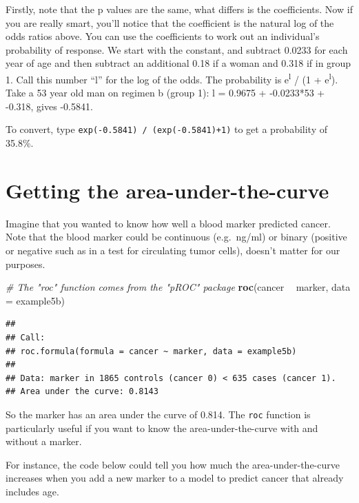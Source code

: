 \documentclass[]{book}
\newenvironment{Shaded}{\begin{snugshade}}{\end{snugshade}}
\newcommand{\CommentTok}[1]{\textcolor[rgb]{0.56,0.35,0.01}{\textit{#1}}}
\newcommand{\DataTypeTok}[1]{\textcolor[rgb]{0.13,0.29,0.53}{#1}}
\newcommand{\KeywordTok}[1]{\textcolor[rgb]{0.13,0.29,0.53}{\textbf{#1}}}
\newcommand{\NormalTok}[1]{#1}
\newcommand{\OperatorTok}[1]{\textcolor[rgb]{0.81,0.36,0.00}{\textbf{#1}}}
\newcommand{\StringTok}[1]{\textcolor[rgb]{0.31,0.60,0.02}{#1}}
\begin{document}
Firstly, note that the p values are the same, what differs is the
coefficients. Now if you are really smart, you'll notice that the
coefficient is the natural log of the odds ratios above. You can use the
coefficients to work out an individual's probability of response. We
start with the constant, and subtract 0.0233 for each year of age and
then subtract an additional 0.18 if a woman and 0.318 if in group 1.
Call this number ``l'' for the log of the odds. The probability is
e\textsuperscript{l} / (1 + e\textsuperscript{l}). Take a 53 year old
man on regimen b (group 1): l = 0.9675 + -0.0233*53 + -0.318, gives
-0.5841.

To convert, type \texttt{exp(-0.5841)\ /\ (exp(-0.5841)+1)} to get a
probability of 35.8\%.

\hypertarget{getting-the-area-under-the-curve}{%
\section{Getting the
area-under-the-curve}\label{getting-the-area-under-the-curve}}

Imagine that you wanted to know how well a blood marker predicted
cancer. Note that the blood marker could be continuous (e.g.~ng/ml) or
binary (positive or negative such as in a test for circulating tumor
cells), doesn't matter for our purposes.

\begin{Shaded}
\begin{Highlighting}[]
\CommentTok{# The "roc" function comes from the "pROC" package}
\KeywordTok{roc}\NormalTok{(cancer }\OperatorTok{~}\StringTok{ }\NormalTok{marker, }\DataTypeTok{data =}\NormalTok{ example5b)}
\end{Highlighting}
\end{Shaded}

\begin{verbatim}
## 
## Call:
## roc.formula(formula = cancer ~ marker, data = example5b)
## 
## Data: marker in 1865 controls (cancer 0) < 635 cases (cancer 1).
## Area under the curve: 0.8143
\end{verbatim}

So the marker has an area under the curve of 0.814. The \texttt{roc}
function is particularly useful if you want to know the
area-under-the-curve with and without a marker.

For instance, the code below could tell you how much the
area-under-the-curve increases when you add a new marker to a model to
predict cancer that already includes age.
\end{document}
